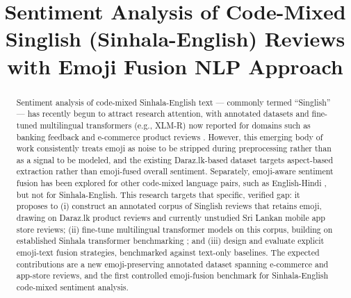 \documentclass[conference]{IEEEtran}
\begin{document}
\title{Sentiment Analysis of Code-Mixed Singlish (Sinhala-English) Reviews with Emoji Fusion NLP Approach\\
}

\author{
}

\maketitle

\begin{abstract}
    Sentiment analysis of code-mixed Sinhala-English text --- commonly termed ``Singlish'' --- has recently begun to attract research
    attention, with annotated datasets and fine-tuned multilingual transformers (e.g., XLM-R) now reported for domains such
    as banking feedback and e-commerce product reviews \citep{aththanayaka2020sentimental, rizvi2025enhancing, galwatta2026salangabhava, dhananjaya2022bertifying}.
    However, this emerging body of work consistently treats emoji as noise to be stripped during preprocessing rather than
    as a signal to be modeled, and the existing Daraz.lk-based dataset targets aspect-based extraction rather than emoji-fused
    overall sentiment. Separately, emoji-aware sentiment fusion has been explored for other code-mixed language pairs, such as
    English-Hindi \citep{singh2024predicting}, but not for Sinhala-English. This research targets that specific,
    verified gap: it proposes to (i) construct an annotated corpus of Singlish reviews that retains emoji, drawing on
    Daraz.lk product reviews and currently unstudied Sri Lankan mobile app store reviews; (ii) fine-tune multilingual
    transformer models on this corpus, building on established Sinhala transformer benchmarking \citep{dhananjaya2022bertifying};
    and (iii) design and evaluate explicit emoji-text fusion strategies, benchmarked against text-only baselines. The expected
    contributions are a new emoji-preserving annotated dataset spanning e-commerce and app-store reviews, and the first controlled
    emoji-fusion benchmark for Sinhala-English code-mixed sentiment analysis.
\end{abstract}
\end{document}

